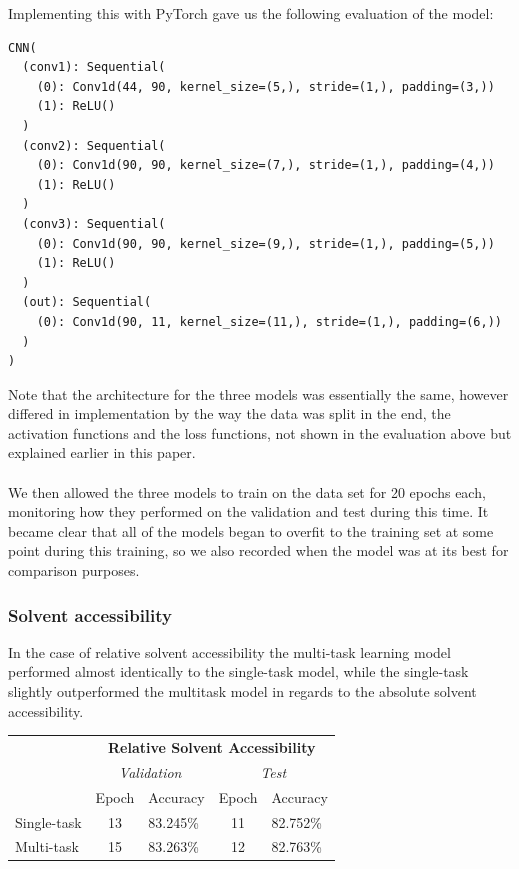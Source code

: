 \noindent Implementing this with PyTorch gave us the following evaluation of the model:
\begin{lstlisting}
CNN(
  (conv1): Sequential(
    (0): Conv1d(44, 90, kernel_size=(5,), stride=(1,), padding=(3,))
    (1): ReLU()
  )
  (conv2): Sequential(
    (0): Conv1d(90, 90, kernel_size=(7,), stride=(1,), padding=(4,))
    (1): ReLU()
  )
  (conv3): Sequential(
    (0): Conv1d(90, 90, kernel_size=(9,), stride=(1,), padding=(5,))
    (1): ReLU()
  )
  (out): Sequential(
    (0): Conv1d(90, 11, kernel_size=(11,), stride=(1,), padding=(6,))
  )
)
\end{lstlisting}
\noindent Note that the architecture for the three models was essentially the same, however differed in implementation by the way the data was split in the end, the activation functions and the loss functions, not shown in the evaluation above but explained earlier in this paper.\\
\\
We then allowed the three models to train on the data set for 20 epochs each, monitoring how they performed on the validation and test during this time. It became clear that all of the models began to overfit to the training set at some point during this training, so we also recorded when the model was at its best for comparison purposes.

\subsubsection{Solvent accessibility}
In the case of relative solvent accessibility the multi-task learning model performed almost identically to the single-task model, while the single-task slightly outperformed the multitask model in regards to the absolute solvent accessibility.

\begin{table}[h]
\centering
\begin{tabular}{lclcl}
 & \multicolumn{4}{c}{\textbf{Relative Solvent Accessibility}} \\
 & \multicolumn{2}{c|}{\textit{Validation}} & \multicolumn{2}{c}{\textit{Test}} \\ \cline{2-5} 
 & \multicolumn{1}{l}{Epoch} & \multicolumn{1}{l|}{Accuracy} & \multicolumn{1}{l}{Epoch} & Accuracy \\
Single-task & 13 & \multicolumn{1}{l|}{83.245\%} & 11 & 82.752\% \\
Multi-task & 15 & \multicolumn{1}{l|}{83.263\%} & 12 & 82.763\%
\end{tabular}
\end{table}

